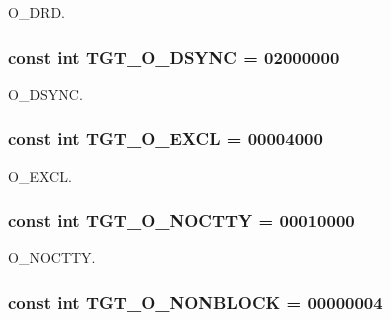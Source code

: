 O\_\-DRD. \hypertarget{classAlphaTru64_ac8d84ac6abb2d868443e4559bed55ebe}{
\subsubsection[{TGT\_\-O\_\-DSYNC}]{\setlength{\rightskip}{0pt plus 5cm}const int {\bf TGT\_\-O\_\-DSYNC} = 02000000}}
\label{classAlphaTru64_ac8d84ac6abb2d868443e4559bed55ebe}


O\_\-DSYNC. \hypertarget{classAlphaTru64_a10d5d118d15b51ebdd4b16dc78342d1d}{
\subsubsection[{TGT\_\-O\_\-EXCL}]{\setlength{\rightskip}{0pt plus 5cm}const int {\bf TGT\_\-O\_\-EXCL} = 00004000}}
\label{classAlphaTru64_a10d5d118d15b51ebdd4b16dc78342d1d}


O\_\-EXCL. \hypertarget{classAlphaTru64_adfd4240281579e5f60c5e22c601225d8}{
\subsubsection[{TGT\_\-O\_\-NOCTTY}]{\setlength{\rightskip}{0pt plus 5cm}const int {\bf TGT\_\-O\_\-NOCTTY} = 00010000}}
\label{classAlphaTru64_adfd4240281579e5f60c5e22c601225d8}


O\_\-NOCTTY. \hypertarget{classAlphaTru64_a0ea5420b4c9b45ba342a266fb77ac942}{
\subsubsection[{TGT\_\-O\_\-NONBLOCK}]{\setlength{\rightskip}{0pt plus 5cm}const int {\bf TGT\_\-O\_\-NONBLOCK} = 00000004}}
\label{classAlphaTru64_a0ea5420b4c9b45ba342a266fb77ac942}


